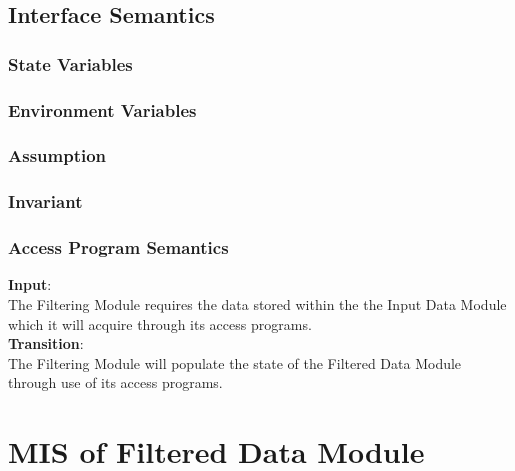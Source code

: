\documentclass[12pt]{article}
\begin{document}
\subsection{Interface Semantics}
\subsubsection{State Variables}
\subsubsection{Environment Variables}
\subsubsection{Assumption}
\subsubsection{Invariant}
\subsubsection{Access Program Semantics}
\textbf{Input}:\\
The Filtering Module requires the data stored within the the Input Data
Module which it will acquire through its access programs.\\
\textbf{Transition}:\\
The Filtering Module will populate the state of the Filtered Data Module through 
use of its access programs.



\section{MIS of Filtered Data Module}
\end{document}
